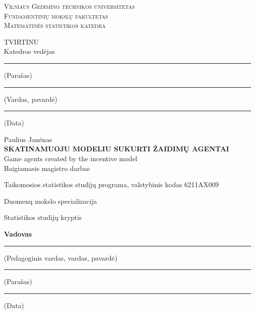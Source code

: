 \documentclass[a4paper, 12pt]{article}
\begin{document}
\begin{titlepage}
\setcounter{page}{-1}
\centering
%
{\Large\scshape Vilniaus Gedimino technikos universitetas}\\[0.2\baselineskip]
{\large\scshape Fundamentinių mokslų fakultetas}\\[0.2\baselineskip]
{\large\scshape Matematinės statistikos katedra}\\[0.2\baselineskip]
%
\vspace{\fill}
%
\begin{flushright}
\parbox{6cm}{%
TVIRTINU\\Katedros vedėjas
\bigskip
\begin{center}
\hrule\medskip
{\footnotesize (Parašas)}\\[\baselineskip]
\hrule\medskip
{\footnotesize (Vardas, pavardė)}\\[\baselineskip]
\hrule\medskip
{\footnotesize (Data)}
\end{center}
}
\end{flushright}
%
\vspace{\fill}
%
{\Large Paulius Janėnas}\\[3.0\baselineskip]

\MakeUppercase{\Large\bfseries  Skatinamuoju modeliu sukurti žaidimų agentai}\\[0.3\baselineskip]
{\Large Game agents created by the incentive model}\\[1.0\baselineskip]

{\Large Baigiamasis magistro darbas}

\vspace{\fill}

Taikomosios statistikos studijų programa, valstybinis kodas 6211AX009

Duomenų mokslo specializacija

Statistikos studijų kryptis

\vspace{\fill}
%
\begin{minipage}[t]{0.15\textwidth}
\bfseries Vadovas
\end{minipage}
%
\hspace{\fill}
%
\begin{minipage}[t]{0.4\textwidth}
\centering{}\hrule\medskip\scriptsize (Pedagoginis vardas, vardas, pavardė)
\end{minipage}
%
\hspace{\fill}
%
\begin{minipage}[t]{0.2\textwidth}
\centering\hrule\medskip\scriptsize (Parašas)
\end{minipage}
%
\hspace{\fill}
%
\begin{minipage}[t]{0.15\textwidth}
\centering\hrule\medskip\scriptsize (Data)
\end{minipage}


\end{titlepage}
\end{document}
